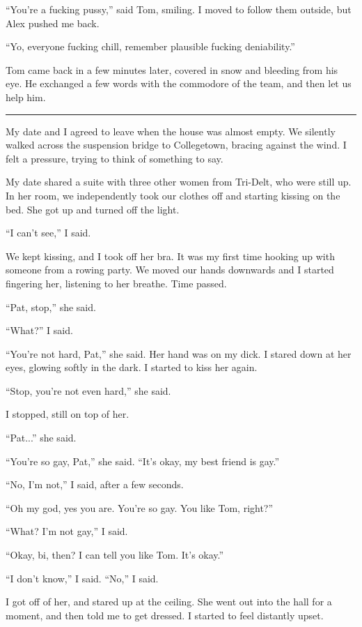 ``You're a fucking pussy,'' said Tom, smiling.  I moved to follow them outside,
but Alex pushed me back.

``Yo, everyone fucking chill, remember plausible fucking deniability.''

Tom came back in a few minutes later, covered in snow and bleeding from his eye.
He exchanged a few words with the commodore of the team, and then let us help
him.

\plainfancybreak{12pt}{2}{}

My date and I agreed to leave when the house was almost empty.  We silently
walked across the suspension bridge to Collegetown, bracing against the wind.  I
felt a pressure, trying to think of something to say.

My date shared a suite with three other women from Tri-Delt, who were still up.
In her room, we independently took our clothes off and starting kissing on the
bed.  She got up and turned off the light.

``I can't see,'' I said.

We kept kissing, and I took off her bra.  It was my first time hooking up with
someone from a rowing party.  We moved our hands downwards and I started
fingering her, listening to her breathe.  Time passed.

``Pat, stop,'' she said.

``What?'' I said.

``You're not hard, Pat,'' she said.  Her hand was on my dick.  I stared down at
her eyes, glowing softly in the dark.  I started to kiss her again.

``Stop, you're not even hard,'' she said.

I stopped, still on top of her.

``Pat...'' she said.

``You're so gay, Pat,'' she said.  ``It's okay, my best friend is gay.''

``No, I'm not,'' I said, after a few seconds.

``Oh my god, yes you are.  You're so gay.  You like Tom, right?''

``What?  I'm not gay,'' I said.

``Okay, bi, then?  I can tell you like Tom.  It's okay.''

``I don't know,'' I said.  ``No,'' I said.

I got off of her, and stared up at the ceiling.  She went out into the hall for
a moment, and then told me to get dressed.  I started to feel distantly upset.

